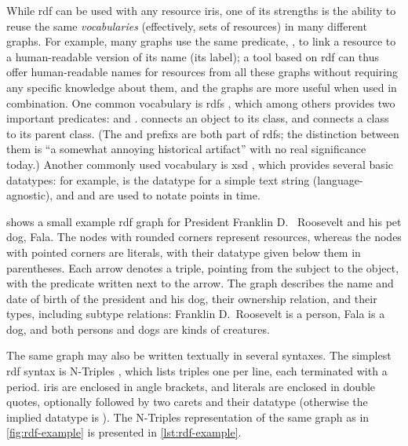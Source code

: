While \gls{rdf} can be used with any \gls{resource} \glspl{iri},
one of its strengths is the ability to reuse the same \emph{vocabularies}
(effectively, sets of \glspl{resource})
in many different graphs.
For example, many graphs use the same \gls{predicate}, ,
to link a \gls{resource} to a human-readable version of its name (its label);
a tool based on \gls{rdf} can thus offer human-readable names for \glspl{resource} from all these graphs
without requiring any specific knowledge about them,
and the graphs are more useful when used in combination.
One common vocabulary is \acrfull{rdfs} \cite{Guha:14:RS},
which among others provides two important predicates:
 and .
 connects an object to its class,
and  connects a class to its parent class.
(The  and  \glspl{prefix} are both part of \acrlong{rdfs};
the distinction between them is “a somewhat annoying historical artifact” \cite{Schreiber:14:RP}
with no real significance today.)
Another commonly used vocabulary is \gls{xsd} \cite{Malhotra:04:XSP},
which provides several basic datatypes:
for example,  is the datatype for a simple text string (language-agnostic),
and  and  are used to notate points in time.

 shows a small example \gls{rdf} graph
for President Franklin D.~ Roosevelt and his pet dog, Fala.
The nodes with rounded corners represent \glspl{resource},
whereas the nodes with pointed corners are literals,
with their datatype given below them in parentheses.
Each arrow denotes a \gls{triple}, pointing from the \gls{subject} to the \gls{object},
with the \gls{predicate} written next to the arrow.
The graph describes the name and date of birth of the president and his dog,
their ownership relation,
and their types, including subtype relations:
Franklin D.~Roosevelt is a person, Fala is a dog,
and both persons and dogs are kinds of creatures.

The same graph may also be written textually in several syntaxes.
The simplest \gls{rdf} syntax is \gls{N-Triples} \cite{Seaborne:14:RN},
which lists \glspl{triple} one per line, each terminated with a period.
\Glspl{iri} are enclosed in angle brackets,
and literals are enclosed in double quotes,
optionally followed by two carets and their datatype
(otherwise the implied datatype is ).
The \gls{N-Triples} representation of the same graph as in \cref{fig:rdf-example}
is presented in \cref{lst:rdf-example}.

